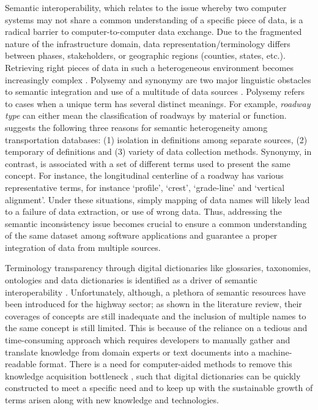 \documentclass[Journal, BackFigs,NoLists, DoubleSpace]{ascelike}%
\begin{document}
Semantic interoperability, which relates to the issue whereby two computer systems may not share a common understanding of a specific piece of data, is a radical barrier to computer-to-computer data exchange. Due to the fragmented nature of the infrastructure domain, data representation/terminology differs between phases, stakeholders, or geographic regions (counties, states, etc.). Retrieving right pieces of data in such a heterogeneous environment becomes increasingly complex \cite{karimi2003semantic}. Polysemy and synonymy are two major linguistic obstacles to semantic integration and use of a multitude of data sources \cite{noy04}. Polysemy refers to cases when a unique term has several distinct meanings. For example, \textit{roadway type} can either mean the classification of roadways by material or function.  suggests the following three reasons for semantic heterogeneity among transportation databases: (1) isolation in definitions among separate sources, (2) temporary of definitions and (3) variety of data collection methods. Synonymy, in contrast, is associated with a set of different terms used to present the same concept. For instance, the longitudinal centerline of a roadway has various representative terms, for instance `profile', `crest', `grade-line' and `vertical alignment'. Under these situations, simply mapping of data names will likely lead to a failure of data extraction, or use of wrong data. Thus, addressing the semantic inconsistency issue becomes crucial to ensure a common understanding of the same dataset among software applications and guarantee a proper integration of data from multiple sources. 
\par
Terminology transparency through digital dictionaries like glossaries, taxonomies, ontologies and data dictionaries is identified as a driver of semantic interoperability \cite{ouksel99}. Unfortunately, although, a plethora of semantic resources have been introduced for the highway sector; as shown in the literature review, their coverages of concepts are still inadequate and the inclusion of multiple names to the same concept is still limited. This is because of the reliance on a tedious and time-consuming approach which requires developers to manually gather and translate knowledge from domain experts or text documents into a machine-readable format. There is a need for computer-aided methods to remove this knowledge acquisition bottleneck \cite{mounce10}, such that digital dictionaries can be quickly constructed to meet a specific need and to keep up with the sustainable growth of terms arisen along with new knowledge and technologies.
\end{document}

